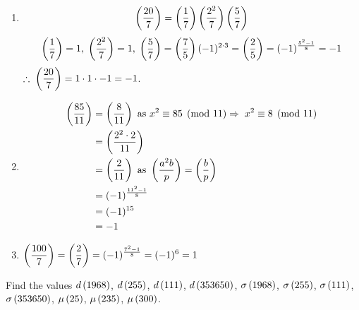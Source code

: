 \documentclass[12pt,class=book,crop=false]{standalone}
\begin{document}
\begin{soln}
\begin{enumerate}
        \item \[\left( \frac{20}{7} \right)=\left( \frac{1}{7} \right)\left( \frac{2^2}{7} \right)\left( \frac{5}{7} \right) \]
        \[\left( \frac{1}{7} \right)=1,\;\left( \frac{2^2}{7} \right)=1,\;\left( \frac{5}{7} \right)=\left( \frac{7}{5} \right)(-1)^{2\cdot 3 }=\left( \frac{2}{5} \right)=(-1)^{\frac{5^2-1}{8}}=-1\]
        $ \displaystyle \therefore\; \left( \frac{20}{7} \right)=1\cdot1\cdot-1=-1 $.
        \item \begin{align*}
            \left( \frac{85}{11} \right)&=\left( \frac{8}{11} \right) \text{ as } x^2\equiv 85 \pmod{11} \Rightarrow\; x^2\equiv 8 \pmod{11}\\
            &=\left( \frac{2^2\cdot 2}{11} \right)\\
            &=\left( \frac{2}{11} \right)\text{ as }\left( \frac{a^2b}{p} \right)=\left( \frac{b}{p} \right)\\
            &=(-1)^{\frac{11^2-1}{8}}\\
            &=(-1)^{15}\\
            &=-1
        \end{align*}
        \item $ \displaystyle \left( \frac{100}{7} \right)=\left( \frac{2}{7} \right)=(-1)^{\frac{7^2-1}{8}}=(-1)^6=1 $
    \end{enumerate}
\end{soln}
\begin{qn}
    Find the values $ d\left( 1968 \right) $, $ d\left( 255 \right) $, $ d\left( 111 \right) $, $ d\left( 353650 \right) $, $ \sigma\left( 1968 \right) $, $ \sigma\left( 255 \right) $, $ \sigma\left( 111 \right) $, $ \sigma\left( 353650 \right) $, $ \mu\left( 25 \right) $, $ \mu\left( 235 \right) $, $ \mu\left( 300 \right) $.
\end{qn}
\end{document}
